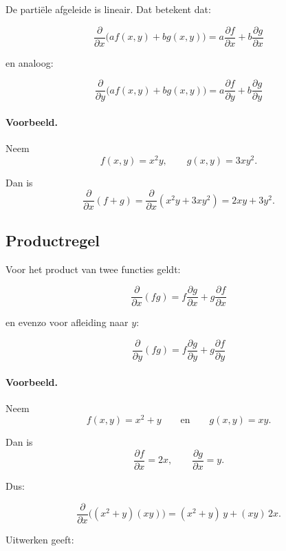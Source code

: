 \documentclass[11pt,a4paper]{article}
\begin{document}
    De partiële afgeleide is lineair. Dat betekent dat:

    \[
        \frac{\partial}{\partial x}\bigl(af(x,y) + bg(x,y)\bigr)
        =
        a \frac{\partial f}{\partial x}
        +
        b \frac{\partial g}{\partial x}
    \]

    en analoog:

    \[
        \frac{\partial}{\partial y}\bigl(af(x,y) + bg(x,y)\bigr)
        =
        a \frac{\partial f}{\partial y}
        +
        b \frac{\partial g}{\partial y}
    \]

    \paragraph{Voorbeeld.}
    Neem
    \[
        f(x,y) = x^2y, \qquad g(x,y) = 3xy^2.
    \]

    Dan is
    \[
        \frac{\partial}{\partial x}(f+g)
        =
        \frac{\partial}{\partial x}(x^2y + 3xy^2)
        =
        2xy + 3y^2.
    \]

    \subsection{Productregel}

    Voor het product van twee functies geldt:

    \[
        \frac{\partial}{\partial x}(fg)
        =
        f \frac{\partial g}{\partial x}
        +
        g \frac{\partial f}{\partial x}
    \]

    en evenzo voor afleiding naar $y$:

    \[
        \frac{\partial}{\partial y}(fg)
        =
        f \frac{\partial g}{\partial y}
        +
        g \frac{\partial f}{\partial y}
    \]

    \paragraph{Voorbeeld.}
    Neem
    \[
        f(x,y)=x^2+y
        \qquad \text{en} \qquad
        g(x,y)=xy.
    \]

    Dan is
    \[
        \frac{\partial f}{\partial x} = 2x,
        \qquad
        \frac{\partial g}{\partial x} = y.
    \]

    Dus:

    \[
        \frac{\partial}{\partial x}\bigl((x^2+y)(xy)\bigr)
        =
        (x^2+y)\,y + (xy)\,2x.
    \]

    Uitwerken geeft:
\end{document}
